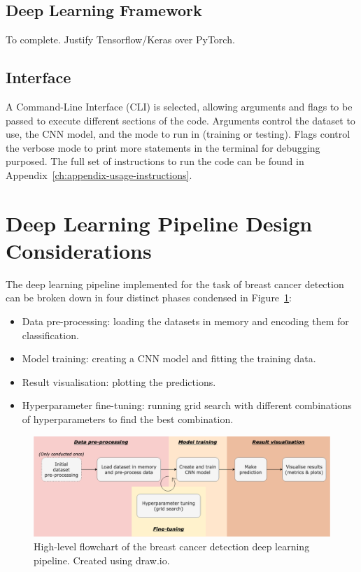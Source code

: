 \subsection{Deep Learning Framework}

To complete. Justify Tensorflow/Keras over PyTorch.

\subsection{Interface}

A Command-Line Interface (CLI) is selected, allowing arguments and flags to be passed to execute different sections of the code. Arguments control the dataset to use, the CNN model, and the mode to run in (training or testing). Flags control the verbose mode to print more statements in the terminal for debugging purposed. The full set of instructions to run the code can be found in Appendix~\ref{ch:appendix-usage-instructions}.


\section{Deep Learning Pipeline Design Considerations}

The deep learning pipeline implemented for the task of breast cancer detection can be broken down in four distinct phases condensed in Figure~\ref{fig:design-flowchart}:

\begin{itemize}
    \item Data pre-processing: loading the datasets in memory and encoding them for classification.
    \item Model training: creating a CNN model and fitting the training data.
    \item Result visualisation: plotting the predictions.
    \item Hyperparameter fine-tuning: running grid search with different combinations of hyperparameters to find the best combination.
\end{itemize}

\begin{figure}[ht]
\centerline{\includegraphics[width=1.1\textwidth]{Dissertation/figures/design/design flowchart.png}}
\caption{\label{fig:design-flowchart}High-level flowchart of the breast cancer detection deep learning pipeline. Created using draw.io.}
\end{figure}

